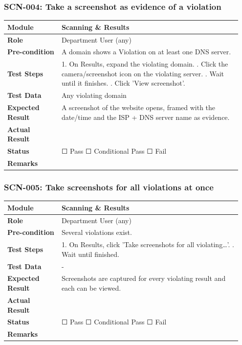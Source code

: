 \documentclass[10pt]{article}
\begin{document}
\subsubsection*{SCN-004: Take a screenshot as evidence of a violation}
\begin{longtable}{p{0.22\linewidth}p{0.73\linewidth}}
\hline
\textbf{Module} & Scanning \& Results \\ \hline
\textbf{Role} & Department User (any) \\ \hline
\textbf{Pre-condition} & A domain shows a Violation on at least one DNS server. \\ \hline
\textbf{Test Steps} & 1. On Results, expand the violating domain. \newline 2. Click the camera/screenshot icon on the violating server. \newline 3. Wait until it finishes. \newline 4. Click 'View screenshot'. \\ \hline
\textbf{Test Data} & Any violating domain \\ \hline
\textbf{Expected Result} & A screenshot of the website opens, framed with the date/time and the ISP + DNS server name as evidence. \\ \hline
\textbf{Actual Result} & \newline \newline \\ \hline
\textbf{Status} & ☐ Pass \quad ☐ Conditional Pass \quad ☐ Fail \\ \hline
\textbf{Remarks} & \newline \\ \hline
\end{longtable}
\subsubsection*{SCN-005: Take screenshots for all violations at once}
\begin{longtable}{p{0.22\linewidth}p{0.73\linewidth}}
\hline
\textbf{Module} & Scanning \& Results \\ \hline
\textbf{Role} & Department User (any) \\ \hline
\textbf{Pre-condition} & Several violations exist. \\ \hline
\textbf{Test Steps} & 1. On Results, click 'Take screenshots for all violating\ldots{}'. \newline 2. Wait until finished. \\ \hline
\textbf{Test Data} & - \\ \hline
\textbf{Expected Result} & Screenshots are captured for every violating result and each can be viewed. \\ \hline
\textbf{Actual Result} & \newline \newline \\ \hline
\textbf{Status} & ☐ Pass \quad ☐ Conditional Pass \quad ☐ Fail \\ \hline
\textbf{Remarks} & \newline \\ \hline
\end{longtable}
\end{document}
